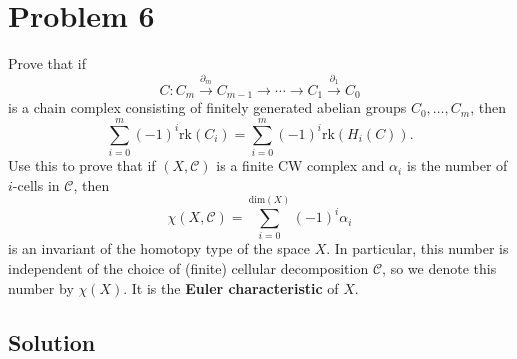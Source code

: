 \documentclass{article}
\theoremstyle{definition}
\begin{document}
\section*{Problem 6}
Prove that if 
$$
C: C_m \stackrel{\partial_m}{\rightarrow} C_{m-1} \rightarrow \cdots \rightarrow C_1 \stackrel{\partial_1}{\rightarrow} C_0
$$ 
is a chain complex consisting of finitely generated abelian groups $C_0, \ldots, C_m$, then
$$
\sum_{i=0}^m (-1)^i\mathrm{rk}(C_i) = \sum_{i=0}^m (-1)^i\mathrm{rk}(H_i(C)).
$$
Use this to prove that if $(X, \mathcal{C})$ is a finite CW complex and $\alpha_i$ is the number of $i$-cells in $\mathcal{C}$, then $$\chi(X,\mathcal{C}) = \sum_{i = 0}^{\mathrm{dim}(X)} (-1)^i \alpha_i$$ is an invariant of the homotopy type of the space $X$. In particular, this number is independent of the choice of (finite) cellular decomposition $\mathcal{C}$, so we denote this number by $\chi(X)$. It is the \textbf{Euler characteristic} of $X$.
\\ \hline
    \subsection*{Solution}

\end{document}
